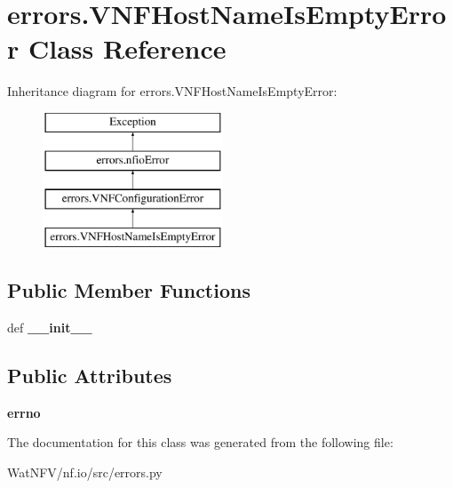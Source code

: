 \hypertarget{classerrors_1_1VNFHostNameIsEmptyError}{\section{errors.\-V\-N\-F\-Host\-Name\-Is\-Empty\-Error Class Reference}
\label{classerrors_1_1VNFHostNameIsEmptyError}
}
Inheritance diagram for errors.\-V\-N\-F\-Host\-Name\-Is\-Empty\-Error\-:\begin{figure}[H]
\begin{center}
\leavevmode
\includegraphics[height=4.000000cm]{classerrors_1_1VNFHostNameIsEmptyError}
\end{center}
\end{figure}
\subsection*{Public Member Functions}
\begin{DoxyCompactItemize}
\item 
\hypertarget{classerrors_1_1VNFHostNameIsEmptyError_a54ff177a72b031db9662672cbc262f86}{def {\bfseries \-\_\-\-\_\-init\-\_\-\-\_\-}}\label{classerrors_1_1VNFHostNameIsEmptyError_a54ff177a72b031db9662672cbc262f86}

\end{DoxyCompactItemize}
\subsection*{Public Attributes}
\begin{DoxyCompactItemize}
\item 
\hypertarget{classerrors_1_1VNFHostNameIsEmptyError_a4a67c7308f0dede292cf6b5654324f39}{{\bfseries errno}}\label{classerrors_1_1VNFHostNameIsEmptyError_a4a67c7308f0dede292cf6b5654324f39}

\end{DoxyCompactItemize}


The documentation for this class was generated from the following file\-:\begin{DoxyCompactItemize}
\item 
Wat\-N\-F\-V/nf.\-io/src/errors.\-py\end{DoxyCompactItemize}
